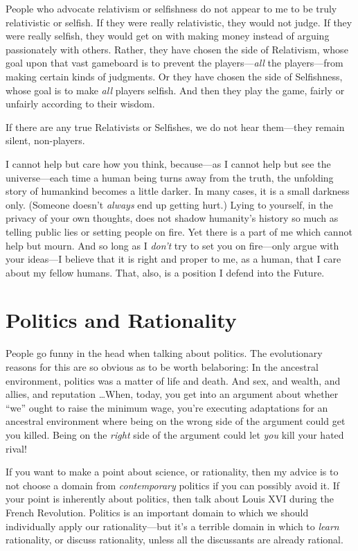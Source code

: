 {
 People who advocate relativism or selfishness do not appear to me
to be truly relativistic or selfish. If they were really relativistic,
they would not judge. If they were really selfish, they would get on
with making money instead of arguing passionately with others. Rather,
they have chosen the side of Relativism, whose goal upon that vast
gameboard is to prevent the players---\textit{all} the players---from
making certain kinds of judgments. Or they have chosen the side of
Selfishness, whose goal is to make \textit{all} players selfish. And
then they play the game, fairly or unfairly according to their wisdom.}

{
 If there are any true Relativists or Selfishes, we do not hear
them---they remain silent, non-players.}

{
 I cannot help but care how you think, because---as I cannot help
but see the universe---each time a human being turns away from the
truth, the unfolding story of humankind becomes a little darker. In
many cases, it is a small darkness only. (Someone
doesn't \textit{always} end up getting hurt.) Lying to
yourself, in the privacy of your own thoughts, does not shadow
humanity's history so much as telling public lies or
setting people on fire. Yet there is a part of me which cannot help but
mourn. And so long as I \textit{don't} try to set you
on fire---only argue with your ideas---I believe that it is right and
proper to me, as a human, that I care about my fellow humans. That,
also, is a position I defend into the Future.}

\myendsectiontext


\chapter{Politics and Rationality}


{
 People go funny in the head when talking about politics. The
evolutionary reasons for this are so obvious as to be worth belaboring:
In the ancestral environment, politics was a matter of life and death.
And sex, and wealth, and allies, and reputation \ldots When, today, you
get into an argument about whether
``we'' ought to raise the minimum
wage, you're executing adaptations for an ancestral
environment where being on the wrong side of the argument could get you
killed. Being on the \textit{right} side of the argument could let
\textit{you} kill your hated rival! }

{
 If you want to make a point about science, or rationality, then my
advice is to not choose a domain from \textit{contemporary} politics if
you can possibly avoid it. If your point is inherently about politics,
then talk about Louis XVI during the French Revolution. Politics is an
important domain to which we should individually apply our
rationality---but it's a terrible domain in which to
\textit{learn} rationality, or discuss rationality, unless all the
discussants are already rational.}

